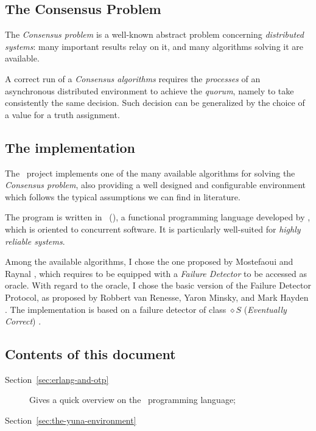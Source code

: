 \subsection{The Consensus Problem}

The \emph{Consensus problem} is a well-known abstract problem concerning
\emph{distributed systems}: many important results relay on it, and many
algorithms solving it are available.

A correct run of a \emph{Consensus algorithms} requires the
\emph{processes} of an asynchronous distributed environment to achieve the
\emph{quorum}, namely to take consistently the same decision. Such
decision can be generalized by the choice of a value for a truth
assignment.


\subsection{The implementation}

The \YUNA\ project implements one of the many available algorithms for
solving the \emph{Consensus problem}, also providing a well designed and
configurable environment which follows the typical assumptions we can find
in literature.

The program is written in \Erlang\ (), a functional
programming language developed by , which is oriented to
concurrent software. It is particularly well-suited for \emph{highly
reliable systems}.

Among the available algorithms, I chose the one proposed by Mostefaoui and
Raynal \cite{bib:Cons}, which requires to be equipped with a \emph{Failure
Detector} to be accessed as oracle. With regard to the oracle, I chose the
basic version of the Failure Detector Protocol, as proposed by Robbert van
Renesse, Yaron Minsky, and Mark Hayden \cite{bib:FD}. The implementation
is based on a failure detector of class $\diamond S$ (\emph{Eventually
Correct}) \cite{bib:QualityFD}.

\subsection{Contents of this document}

\begin{description}

    \item[Section~\ref{sec:erlang-and-otp}] Gives a quick overview on the
        \Erlang\ programming language;

    \item[Section~\ref{sec:the-yuna-environment}]

\end{description}
